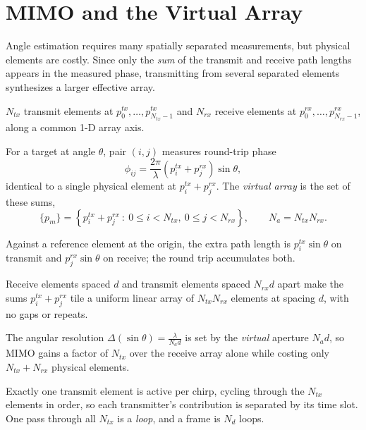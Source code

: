 \section{MIMO and the Virtual Array}

Angle estimation requires many spatially separated measurements, but physical elements are costly. Since only the \emph{sum} of the transmit and receive path lengths appears in the measured phase, transmitting from several separated elements synthesizes a larger effective array.

\begin{definition}
$N_{tx}$ transmit elements at $p^{tx}_0, \dots, p^{tx}_{N_{tx}-1}$ and $N_{rx}$ receive elements at $p^{rx}_0, \dots, p^{rx}_{N_{rx}-1}$, along a common 1-D array axis.
\end{definition}

\begin{definition}
For a target at angle $\theta$, pair $(i, j)$ measures round-trip phase
$$\phi_{ij} = \frac{2\pi}{\lambda}\left(p^{tx}_i + p^{rx}_j\right)\sin\theta,$$
identical to a single physical element at $p^{tx}_i + p^{rx}_j$. The \emph{virtual array} is the set of these sums,
$$\{p_m\} = \left\{p^{tx}_i + p^{rx}_j \ : \ 0 \leq i < N_{tx}, \ 0 \leq j < N_{rx}\right\}, \qquad N_a = N_{tx}N_{rx}.$$
\end{definition}
Against a reference element at the origin, the extra path length is $p^{tx}_i\sin\theta$ on transmit and $p^{rx}_j\sin\theta$ on receive; the round trip accumulates both.

\begin{remark}
Receive elements spaced $d$ and transmit elements spaced $N_{rx}d$ apart make the sums $p^{tx}_i + p^{rx}_j$ tile a uniform linear array of $N_{tx}N_{rx}$ elements at spacing $d$, with no gaps or repeats.
\end{remark}

\begin{remark}
The angular resolution $\Delta(\sin\theta) = \frac{\lambda}{N_ad}$ is set by the \emph{virtual} aperture $N_ad$, so MIMO gains a factor of $N_{tx}$ over the receive array alone while costing only $N_{tx} + N_{rx}$ physical elements.
\end{remark}

\begin{definition}
Exactly one transmit element is active per chirp, cycling through the $N_{tx}$ elements in order, so each transmitter's contribution is separated by its time slot. One pass through all $N_{tx}$ is a \emph{loop}, and a frame is $N_d$ loops.
\end{definition}

